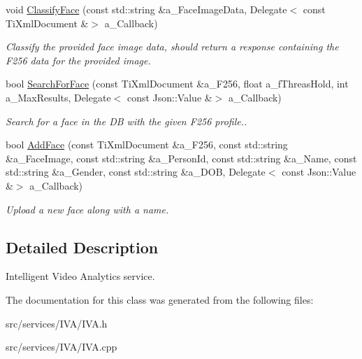 \begin{DoxyCompactItemize}
void \hyperlink{class_i_v_a_ab72fafe17f99f3ca7d01cdb8a9fa9691}{Classify\+Face} (const std\+::string \&a\+\_\+\+Face\+Image\+Data, Delegate$<$ const Ti\+Xml\+Document \&$>$ a\+\_\+\+Callback)
\begin{DoxyCompactList}\small\item\em Classify the provided face image data, should return a response containing the F256 data for the provided image. \end{DoxyCompactList}\item 
\mbox{\label{class_i_v_a_a7b4ac8913c4ddb0f9ed9b52ca778584c}} 
bool \hyperlink{class_i_v_a_a7b4ac8913c4ddb0f9ed9b52ca778584c}{Search\+For\+Face} (const Ti\+Xml\+Document \&a\+\_\+\+F256, float a\+\_\+f\+Threas\+Hold, int a\+\_\+\+Max\+Results, Delegate$<$ const Json\+::\+Value \&$>$ a\+\_\+\+Callback)
\begin{DoxyCompactList}\small\item\em Search for a face in the DB with the given F256 profile.. \end{DoxyCompactList}\item 
\mbox{\label{class_i_v_a_a28f7cfebce4b1ee7fd5fdac1226e8743}} 
bool \hyperlink{class_i_v_a_a28f7cfebce4b1ee7fd5fdac1226e8743}{Add\+Face} (const Ti\+Xml\+Document \&a\+\_\+\+F256, const std\+::string \&a\+\_\+\+Face\+Image, const std\+::string \&a\+\_\+\+Person\+Id, const std\+::string \&a\+\_\+\+Name, const std\+::string \&a\+\_\+\+Gender, const std\+::string \&a\+\_\+\+D\+OB, Delegate$<$ const Json\+::\+Value \&$>$ a\+\_\+\+Callback)
\begin{DoxyCompactList}\small\item\em Upload a new face along with a name. \end{DoxyCompactList}\end{DoxyCompactItemize}


\subsection{Detailed Description}
Intelligent Video Analytics service. 

The documentation for this class was generated from the following files\+:\begin{DoxyCompactItemize}
\item 
src/services/\+I\+V\+A/I\+V\+A.\+h\item 
src/services/\+I\+V\+A/I\+V\+A.\+cpp\end{DoxyCompactItemize}
